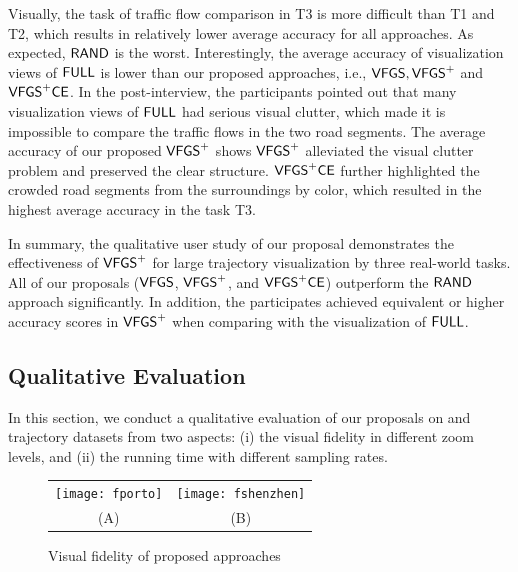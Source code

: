 

Visually, the task of traffic flow comparison in T3 is more difficult than T1 and T2, which results in relatively lower average accuracy for all approaches.  As expected, $\mathsf{RAND}$ is the worst.
Interestingly, the average accuracy of visualization views of $\mathsf{FULL}$ is lower than our proposed approaches, i.e., $\mathsf{VFGS},\mathsf{VFGS}^{+}$ and $\mathsf{VFGS}^{+}\mathsf{CE}$.
In the post-interview, the participants pointed out that many visualization views of $\mathsf{FULL}$ had serious visual clutter,
which made it is impossible to compare the traffic flows in the two road segments.
The average accuracy of our proposed $\mathsf{VFGS}^{+}$ shows $\mathsf{VFGS}^{+}$ alleviated the visual clutter problem and preserved the clear structure.
$\mathsf{VFGS}^{+}\mathsf{CE}$ further highlighted the crowded road segments from the surroundings by color, which {resulted in} the highest average accuracy in the task T3.

In summary, the qualitative user study of our proposal demonstrates the effectiveness of $\mathsf{VFGS}^{+}$ for large trajectory visualization by three real-world tasks.
All of our proposals ($\mathsf{VFGS}$, $\mathsf{VFGS}^{+}$, and $\mathsf{VFGS}^{+}\mathsf{CE}$) outperform the $\mathsf{RAND}$ approach significantly.
In addition, the participates achieved equivalent or higher accuracy scores in $\mathsf{VFGS}^{+}$ when comparing with the visualization of $\mathsf{FULL}$.

\subsection{Qualitative Evaluation}\label{sec:quality}
In this section, we conduct a qualitative evaluation of our proposals on \pt{} and \sz{} trajectory datasets from two aspects: (i) the visual fidelity in different zoom levels,
and (ii) the running time with different sampling rates.

\begin{figure}
 \centering
 \small
 \begin{tabular}{cc}
   \texttt{[image: fporto]}
   &
   \texttt{[image: fshenzhen]}
   \\
   (A) \pt{}
   &
   (B) \sz{}
 \end{tabular}
 \vspace{-3mm}
 \caption{Visual fidelity of proposed approaches}
 \label{fig:fidelity}
 \vspace{-4mm}
\end{figure}

